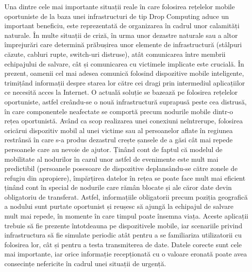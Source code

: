 \documentclass[12pt,a4paper]{report}
\begin{document}
Una dintre cele mai importante situații reale în care folosirea rețelelor mobile oportuniste de la baza unei infrastructuri de tip Drop Computing aduce un important beneficiu, este reprezentată de organizarea în cadrul unor calamități naturale. În multe situații de criză, în urma unor dezastre naturale sau a altor împrejurări care determină prăbușirea unor elemente de infrastructură (stâlpuri căzute, cabluri rupte, switch-uri distruse), atât comunicarea între membrii echipajului de salvare, cât și comunicarea cu victimele implicate este crucială. În prezent, oamenii cel mai adesea comunică folosind dispozitive mobile inteligente, trimițând informații despre starea lor către cei dragi prin intermediul aplicațiilor ce necesită acces la Internet. O actuală soluție se bazează pe folosirea rețelelor oportuniste, astfel creându-se o nouă infrastructură suprapusă peste cea distrusă, în care componentele neafectate se comportă precum nodurile mobile dintr-o rețea oportunistă. Având ca scop realizarea unei conexiuni neîntrerupe, folosirea oricărui dispozitiv mobil al unei victime sau al persoanelor aflate în regiunea restrânsă în care s-a produs dezastrul crește șansele de a găsi cât mai repede persoanele care au nevoie de ajutor. Ținând cont de faptul că modelul de mobilitate al nodurilor în cazul unor astfel de evenimente este mult mai predictibil (persoanele posesoare de dispozitive deplansându-se către zonele de refugiu din apropiere), împărțirea datelor în rețea se poate face mult mai eficient ținând cont în special de nodurile care rămân blocate și ale căror date devin obligatoriu de transferat. Astfel, informațiile obligatorii precum poziția geografică a nodului sunt purtate oportunist și reușesc să ajungă la echipajul de salvare mult mai repede, în momente în care timpul poate însemna viața. Aceste aplicații trebuie să fie prezente întotdeauna pe dispozitivele mobile, iar scenariile privind infrastructura să fie simulate periodic atât pentru a se familiariza utilizatorii cu folosirea lor, cât și pentru a testa transmiterea de date. Datele corecte sunt cele mai importante, iar orice informație recepționată cu o valoare eronată poate avea consecințe nefericite în cadrul unei situații de urgență.
\end{document}

